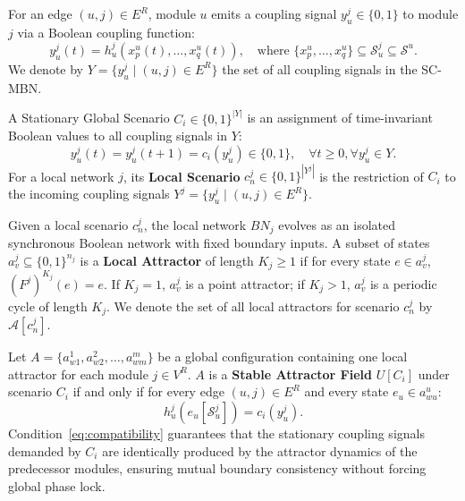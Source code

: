 \documentclass{svproc}
\begin{document}
\begin{definition}
For an edge $(u, j) \in E^R$, module $u$ emits a coupling signal $y_u^j \in \{0,1\}$ to module $j$ via a Boolean coupling function:
\begin{equation}
    y_u^j(t) = h_u^j\left(x_{p}^u(t), \dots, x_{q}^u(t)\right), \quad \text{where } \{x_{p}^u, \dots, x_{q}^u\} \subseteq \mathcal{S}_u^j \subseteq \mathcal{S}^u.
\end{equation}
We denote by $Y = \{y_u^j \mid (u,j) \in E^R\}$ the set of all coupling signals in the SC-MBN.
\end{definition}

\begin{definition}
A Stationary Global Scenario $C_i \in \{0, 1\}^{|Y|}$ is an assignment of time-invariant Boolean values to all coupling signals in $Y$:
\begin{equation}
    y_u^j(t) = y_u^j(t+1) = c_i(y_u^j) \in \{0,1\}, \quad \forall t \ge 0, \forall y_u^j \in Y.
\end{equation}
For a local network $j$, its \textbf{Local Scenario} $c_n^j \in \{0,1\}^{|Y^j|}$ is the restriction of $C_i$ to the incoming coupling signals $Y^j = \{y_u^j \mid (u,j) \in E^R\}$.
\end{definition}

\begin{definition}
Given a local scenario $c_n^j$, the local network $BN_j$ evolves as an isolated synchronous Boolean network with fixed boundary inputs. A subset of states $a_v^j \subseteq \{0,1\}^{n_j}$ is a \textbf{Local Attractor} of length $K_j \ge 1$ if for every state $e \in a_v^j$, $(F^j)^{K_j}(e) = e$.
If $K_j = 1$, $a_v^j$ is a point attractor; if $K_j > 1$, $a_v^j$ is a periodic cycle of length $K_j$. We denote the set of all local attractors for scenario $c_n^j$ by $\mathcal{A}[c_n^j]$.
\end{definition}

\begin{definition}
Let $A = \{a_{w1}^1, a_{w2}^2, \dots, a_{wm}^m\}$ be a global configuration containing one local attractor for each module $j \in V^R$. $A$ is a \textbf{Stable Attractor Field} $U[C_i]$ under scenario $C_i$ if and only if for every edge $(u, j) \in E^R$ and every state $e_u \in a_{wu}^u$:
\begin{equation}
    h_u^j\left(e_u\left[\mathcal{S}_u^j\right]\right) = c_i(y_u^j).
    \label{eq:compatibility}
\end{equation}
Condition~\eqref{eq:compatibility} guarantees that the stationary coupling signals demanded by $C_i$ are identically produced by the attractor dynamics of the predecessor modules, ensuring mutual boundary consistency without forcing global phase lock.
\end{definition}
\end{document}
